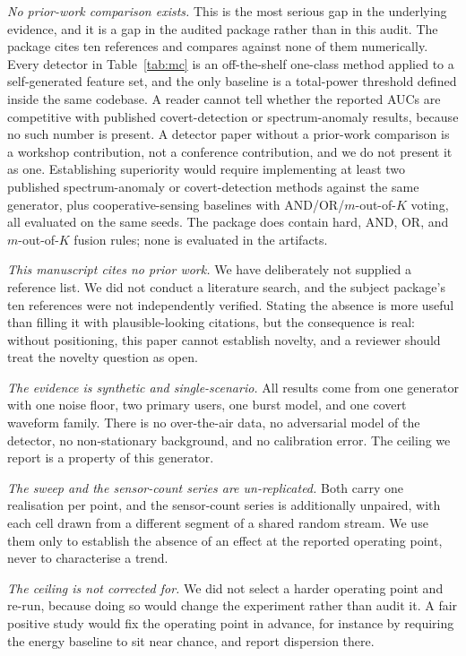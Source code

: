 \documentclass[conference]{IEEEtran}
\begin{document}
\emph{No prior-work comparison exists.} This is the most serious gap in the underlying evidence, and it is a gap in the audited package rather than in this audit. The package cites ten references and compares against none of them numerically. Every detector in Table~\ref{tab:mc} is an off-the-shelf one-class method applied to a self-generated feature set, and the only baseline is a total-power threshold defined inside the same codebase. A reader cannot tell whether the reported AUCs are competitive with published covert-detection or spectrum-anomaly results, because no such number is present. A detector paper without a prior-work comparison is a workshop contribution, not a conference contribution, and we do not present it as one. Establishing superiority would require implementing at least two published spectrum-anomaly or covert-detection methods against the same generator, plus cooperative-sensing baselines with AND/OR/$m$-out-of-$K$ voting, all evaluated on the same seeds. The package does contain hard, AND, OR, and $m$-out-of-$K$ fusion rules; none is evaluated in the artifacts.

\emph{This manuscript cites no prior work.} We have deliberately not supplied a reference list. We did not conduct a literature search, and the subject package's ten references were not independently verified. Stating the absence is more useful than filling it with plausible-looking citations, but the consequence is real: without positioning, this paper cannot establish novelty, and a reviewer should treat the novelty question as open.

\emph{The evidence is synthetic and single-scenario.} All results come from one generator with one noise floor, two primary users, one burst model, and one covert waveform family. There is no over-the-air data, no adversarial model of the detector, no non-stationary background, and no calibration error. The ceiling we report is a property of this generator.

\emph{The sweep and the sensor-count series are un-replicated.} Both carry one realisation per point, and the sensor-count series is additionally unpaired, with each cell drawn from a different segment of a shared random stream. We use them only to establish the absence of an effect at the reported operating point, never to characterise a trend.

\emph{The ceiling is not corrected for.} We did not select a harder operating point and re-run, because doing so would change the experiment rather than audit it. A fair positive study would fix the operating point in advance, for instance by requiring the energy baseline to sit near chance, and report dispersion there.
\end{document}
